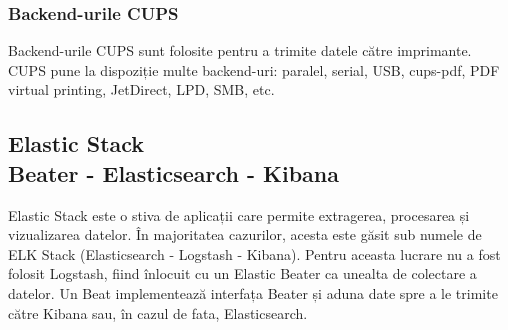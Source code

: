 \documentclass[a4paper, 12pt, twoside]{report}
\begin{document}
			\subsubsection{Backend-urile CUPS}
Backend-urile CUPS sunt folosite pentru a trimite datele către imprimante. CUPS pune la dispoziție multe backend-uri: paralel, serial, USB, cups-pdf, PDF virtual printing, JetDirect, LPD, SMB, etc.

\subsection[Elastic Stack]{Elastic Stack\\ {\normalsize Beater - Elasticsearch - Kibana}}
Elastic Stack este o stiva de aplicații care permite extragerea, procesarea și vizualizarea datelor. În majoritatea cazurilor, acesta este găsit sub numele de ELK Stack (Elasticsearch - Logstash - Kibana). Pentru aceasta lucrare nu a fost folosit Logstash, fiind înlocuit cu un Elastic Beater ca unealta de colectare a datelor. Un Beat implementează interfața Beater și aduna date spre a le trimite către Kibana sau, în cazul de fata, Elasticsearch.
		
\end{document}
